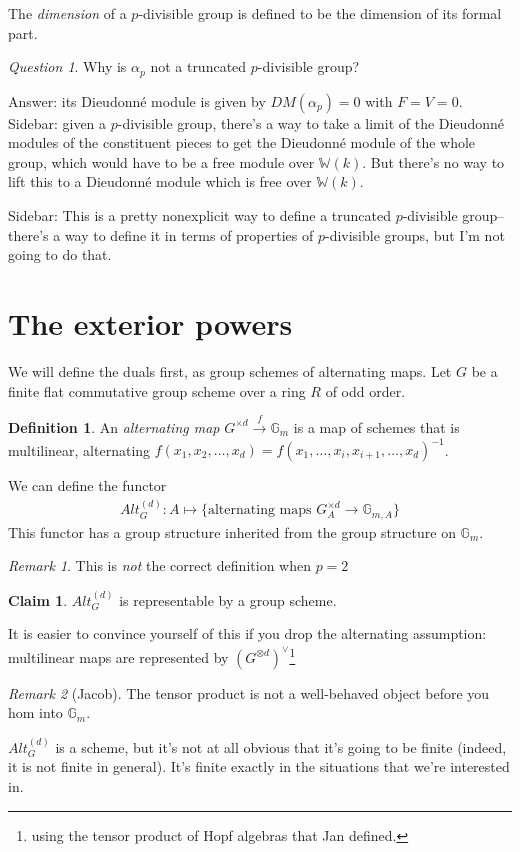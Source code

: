 \documentclass{article}
\newcommand{\W}{{\mathbb{W}}}
\renewcommand{\G}{{\mathbb{G}}}
\theoremstyle{definition} \newtheorem*{defn}{Definition}
\theoremstyle{plain} \newtheorem*{prop}{Proposition}
\theoremstyle{plain} \newtheorem*{lemma}{Lemma}
\theoremstyle{plain} \newtheorem*{cor}{Corollary}
\theoremstyle{remark} \newtheorem*{ex}{Example}
\theoremstyle{remark} \newtheorem*{exs}{Examples}
\theoremstyle{remark} \newtheorem*{nonex}{Non-example}
\theoremstyle{remark} \newtheorem*{rmk}{Remark}
\theoremstyle{remark} \newtheorem*{exc}{Exercise}
\theoremstyle{remark} \newtheorem*{idea}{Idea}
\theoremstyle{remark} \newtheorem*{obs}{Observation}
\theoremstyle{plain} \newtheorem*{theorem}{Theorem}
\theoremstyle{plain} \newtheorem*{conj}{Conjecture}
\theoremstyle{remark} \newtheorem*{q}{Question}
\theoremstyle{definition} \newtheorem*{fact}{Fact}
\theoremstyle{definition} \newtheorem*{facts}{Facts}
\theoremstyle{remark} \newtheorem*{ntn}{Notation}
\theoremstyle{remark} \newtheorem*{goal}{Goal}
\theoremstyle{remark} \newtheorem*{sketch}{Sketch}
\theoremstyle{definition} \newtheorem{claim}{Claim}
\begin{document}
The \emph{dimension} of a $ p $-divisible group is defined to be the dimension of its formal part. 

\begin{q}
	Why is $ \alpha_p $ not a truncated $ p $-divisible group? 
\end{q}
Answer: its Dieudonn\'e module is given by $ DM(\alpha_p) = 0 $ with $ F = V = 0 $. 
Sidebar: given a $p $-divisible group, there's a way to take a limit of the Dieudonn\'e modules of the constituent pieces to get the Dieudonn\'e module of the whole group, which would have to be a free module over $ \W(k) $. 
But there's no way to lift this to a Dieudonn\'e module which is free over $ \W(k) $. 

Sidebar: This is a pretty nonexplicit way to define a truncated $ p $-divisible group--there's a way to define it in terms of properties of $ p $-divisible groups, but I'm not going to do that. 

\section{The exterior powers}
We will define the duals first, as group schemes of alternating maps. 
Let $ G $ be a finite flat commutative group scheme over a ring $ R $ of odd order. 
\begin{defn}
	An \emph{alternating map} $ G^{\times d} \xrightarrow{f} \G_m $ is a map of schemes that is multilinear, alternating $ f(x_1, x_2, \ldots, x_d) = f(x_1, \ldots, x_i, x_{i+1}, \ldots, x_d)^{-1} $. 

	We can define the functor
	\begin{align}
		Alt_G^{(d)}: A \mapsto \{\text{alternating maps } G_A^{\times d} \to \G_{m, A} \}
	\end{align}
	This functor has a group structure inherited from the group structure on $ \G_m $. 
\end{defn}
\begin{rmk}
	This is \emph{not} the correct definition when $ p = 2 $
\end{rmk}

\begin{claim}
	$ Alt_G^{(d)} $ is representable by a group scheme. 
\end{claim}
It is easier to convince yourself of this if you drop the alternating assumption: multilinear maps are represented by $ ( G^{\otimes d})^\vee $\footnote{using the tensor product of Hopf algebras that Jan defined.} 
\begin{rmk}
	[Jacob] The tensor product is not a well-behaved object before you hom into $ \G_m $. 

	$ Alt_G^{(d)} $ is a scheme, but it's not at all obvious that it's going to be finite (indeed, it is not finite in general). 
	It's finite exactly in the situations that we're interested in. 
\end{rmk} 
\end{document}
